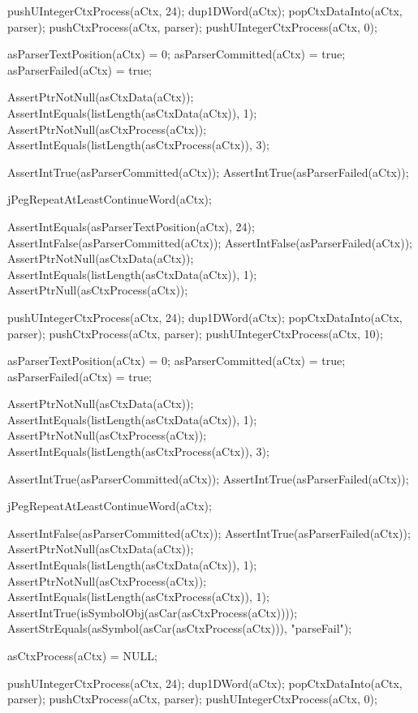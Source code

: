 \startCTest
  pushUIntegerCtxProcess(aCtx, 24);
  dup1DWord(aCtx);
  popCtxDataInto(aCtx, parser);
  pushCtxProcess(aCtx, parser);
  pushUIntegerCtxProcess(aCtx, 0);

  asParserTextPosition(aCtx) = 0;
  asParserCommitted(aCtx)    = true;
  asParserFailed(aCtx)       = true;

  AssertPtrNotNull(asCtxData(aCtx));
  AssertIntEquals(listLength(asCtxData(aCtx)), 1);
  AssertPtrNotNull(asCtxProcess(aCtx));
  AssertIntEquals(listLength(asCtxProcess(aCtx)), 3);
  
  AssertIntTrue(asParserCommitted(aCtx));
  AssertIntTrue(asParserFailed(aCtx));
  
  jPegRepeatAtLeastContinueWord(aCtx);
  
  AssertIntEquals(asParserTextPosition(aCtx), 24);
  AssertIntFalse(asParserCommitted(aCtx));
  AssertIntFalse(asParserFailed(aCtx));
  AssertPtrNotNull(asCtxData(aCtx));
  AssertIntEquals(listLength(asCtxData(aCtx)), 1);
  AssertPtrNull(asCtxProcess(aCtx));
\stopCTest
\stopTestCase

\startCTest
  pushUIntegerCtxProcess(aCtx, 24);
  dup1DWord(aCtx);
  popCtxDataInto(aCtx, parser);
  pushCtxProcess(aCtx, parser);
  pushUIntegerCtxProcess(aCtx, 10);
  
  asParserTextPosition(aCtx) = 0;
  asParserCommitted(aCtx)    = true;
  asParserFailed(aCtx)       = true;
  
  AssertPtrNotNull(asCtxData(aCtx));
  AssertIntEquals(listLength(asCtxData(aCtx)), 1);
  AssertPtrNotNull(asCtxProcess(aCtx));
  AssertIntEquals(listLength(asCtxProcess(aCtx)), 3);
  
  AssertIntTrue(asParserCommitted(aCtx));
  AssertIntTrue(asParserFailed(aCtx));
  
  jPegRepeatAtLeastContinueWord(aCtx);
  
  AssertIntFalse(asParserCommitted(aCtx));
  AssertIntTrue(asParserFailed(aCtx));
  AssertPtrNotNull(asCtxData(aCtx));
  AssertIntEquals(listLength(asCtxData(aCtx)), 1);
  AssertPtrNotNull(asCtxProcess(aCtx));
  AssertIntEquals(listLength(asCtxProcess(aCtx)), 1);
  AssertIntTrue(isSymbolObj(asCar(asCtxProcess(aCtx))));
  AssertStrEquals(asSymbol(asCar(asCtxProcess(aCtx))), "parseFail");
\stopCTest
\stopTestCase

\startCTest
  asCtxProcess(aCtx) = NULL;
  
  pushUIntegerCtxProcess(aCtx, 24);
  dup1DWord(aCtx);
  popCtxDataInto(aCtx, parser);
  pushCtxProcess(aCtx, parser);
  pushUIntegerCtxProcess(aCtx, 0);
  
